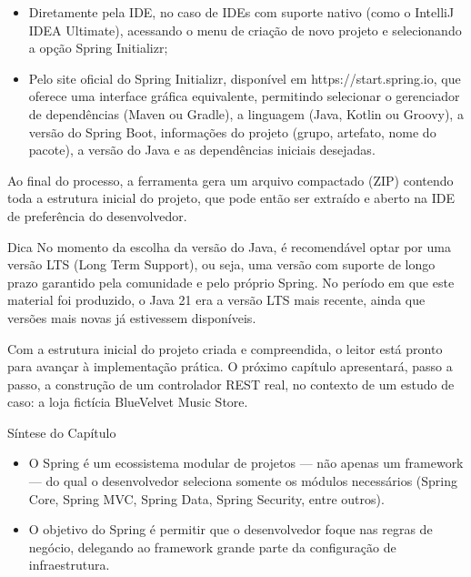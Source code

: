 \begin{itemize}
  \item Diretamente pela IDE, no caso de IDEs com suporte nativo (como o IntelliJ IDEA Ultimate), acessando o menu de criação de novo projeto e selecionando a opção Spring Initializr;
\end{itemize}

\begin{itemize}
  \item Pelo site oficial do Spring Initializr, disponível em https://start.spring.io, que oferece uma interface gráfica equivalente, permitindo selecionar o gerenciador de dependências (Maven ou Gradle), a linguagem (Java, Kotlin ou Groovy), a versão do Spring Boot, informações do projeto (grupo, artefato, nome do pacote), a versão do Java e as dependências iniciais desejadas.
\end{itemize}

Ao final do processo, a ferramenta gera um arquivo compactado (ZIP) contendo toda a estrutura inicial do projeto, que pode então ser extraído e aberto na IDE de preferência do desenvolvedor.

\begin{infobox}{Dica}
No momento da escolha da versão do Java, é recomendável optar por uma versão LTS (Long Term Support), ou seja, uma versão com suporte de longo prazo garantido pela comunidade e pelo próprio Spring. No período em que este material foi produzido, o Java 21 era a versão LTS mais recente, ainda que versões mais novas já estivessem disponíveis.
\end{infobox}

Com a estrutura inicial do projeto criada e compreendida, o leitor está pronto para avançar à implementação prática. O próximo capítulo apresentará, passo a passo, a construção de um controlador REST real, no contexto de um estudo de caso: a loja fictícia BlueVelvet Music Store.

Síntese do Capítulo

\begin{itemize}
  \item O Spring é um ecossistema modular de projetos — não apenas um framework — do qual o desenvolvedor seleciona somente os módulos necessários (Spring Core, Spring MVC, Spring Data, Spring Security, entre outros).
\end{itemize}

\begin{itemize}
  \item O objetivo do Spring é permitir que o desenvolvedor foque nas regras de negócio, delegando ao framework grande parte da configuração de infraestrutura.
\end{itemize}

